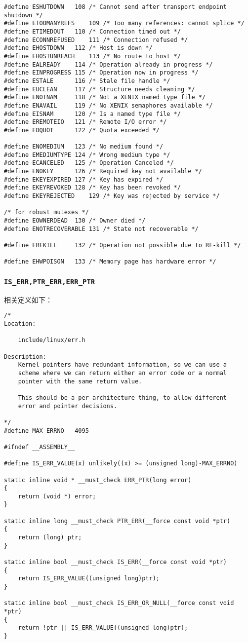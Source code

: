 \begin{verbatim}
#define	ESHUTDOWN	108	/* Cannot send after transport endpoint shutdown */
#define	ETOOMANYREFS	109	/* Too many references: cannot splice */
#define	ETIMEDOUT	110	/* Connection timed out */
#define	ECONNREFUSED	111	/* Connection refused */
#define	EHOSTDOWN	112	/* Host is down */
#define	EHOSTUNREACH	113	/* No route to host */
#define	EALREADY	114	/* Operation already in progress */
#define	EINPROGRESS	115	/* Operation now in progress */
#define	ESTALE		116	/* Stale file handle */
#define	EUCLEAN		117	/* Structure needs cleaning */
#define	ENOTNAM		118	/* Not a XENIX named type file */
#define	ENAVAIL		119	/* No XENIX semaphores available */
#define	EISNAM		120	/* Is a named type file */
#define	EREMOTEIO	121	/* Remote I/O error */
#define	EDQUOT		122	/* Quota exceeded */

#define	ENOMEDIUM	123	/* No medium found */
#define	EMEDIUMTYPE	124	/* Wrong medium type */
#define	ECANCELED	125	/* Operation Canceled */
#define	ENOKEY		126	/* Required key not available */
#define	EKEYEXPIRED	127	/* Key has expired */
#define	EKEYREVOKED	128	/* Key has been revoked */
#define	EKEYREJECTED	129	/* Key was rejected by service */

/* for robust mutexes */
#define	EOWNERDEAD	130	/* Owner died */
#define	ENOTRECOVERABLE	131	/* State not recoverable */

#define ERFKILL		132	/* Operation not possible due to RF-kill */

#define EHWPOISON	133	/* Memory page has hardware error */
\end{verbatim}
			\subsubsection{\texttt{IS_ERR,PTR_ERR,ERR_PTR}}
				\label{Appendix:ERR}
				相关定义如下：
\begin{verbatim}
/*
Location:

	include/linux/err.h

Description:
 	Kernel pointers have redundant information, so we can use a
	scheme where we can return either an error code or a normal
	pointer with the same return value.

	This should be a per-architecture thing, to allow different
	error and pointer decisions.

*/
#define MAX_ERRNO	4095

#ifndef __ASSEMBLY__

#define IS_ERR_VALUE(x) unlikely((x) >= (unsigned long)-MAX_ERRNO)

static inline void * __must_check ERR_PTR(long error)
{
	return (void *) error;
}

static inline long __must_check PTR_ERR(__force const void *ptr)
{
	return (long) ptr;
}

static inline bool __must_check IS_ERR(__force const void *ptr)
{
	return IS_ERR_VALUE((unsigned long)ptr);
}

static inline bool __must_check IS_ERR_OR_NULL(__force const void *ptr)
{
	return !ptr || IS_ERR_VALUE((unsigned long)ptr);
}
\end{verbatim}


